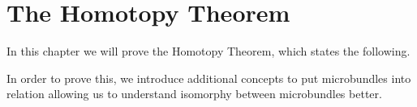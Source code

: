 \chapter{The Homotopy Theorem}\label{chapter::homotopy}
\begin{myparagraph}
    In this chapter we will prove the Homotopy Theorem,
    which states the following.
\end{myparagraph}

\begin{myparagraph}
    In order to prove this, we introduce additional
    concepts to put microbundles into relation allowing us to
    understand isomorphy between microbundles better.
\end{myparagraph}









